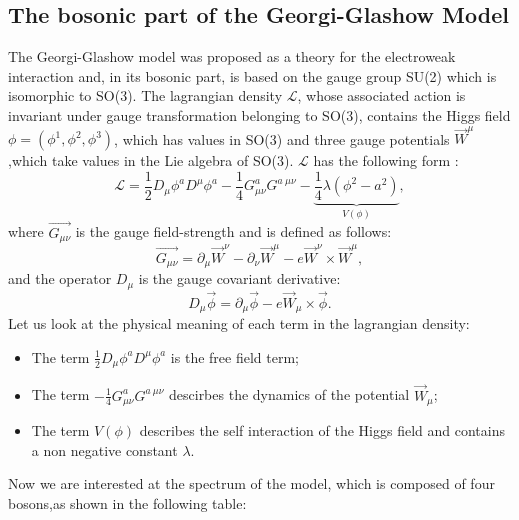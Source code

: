 \documentclass[main.tex]{subfiles}
\begin{document}
\subsection{The bosonic part of the Georgi-Glashow Model}
The Georgi-Glashow model was proposed as a theory for the electroweak interaction and, in its bosonic part, is based on the gauge group SU(2) which is isomorphic to SO(3).
The lagrangian density $\mathcal{L}$, whose associated action is invariant under gauge transformation belonging to SO(3), contains the Higgs field $\phi = ( \phi^1, \phi^2 , \phi^3)$, which has values in SO(3) and three gauge potentials $\Vec{W}^\mu$,which take values in the Lie algebra of SO(3).
$\mathcal{L}$ has the following form :
\begin{equation}
\mathcal{L}= \frac{1}{2}D_{\mu}\phi^a D^\mu \phi^a  -\frac{1}{4} G_{\mu \nu}^a G^{a \ \mu \nu} - \underbrace{\frac{1}{4}\lambda (\phi^2 -a^2)}_{V(\phi)},
\end{equation}
where $\Vec{G_{\mu \nu}}$ is the gauge field-strength and is defined as follows:
\begin{equation}
\Vec{G_{\mu \nu}} = \partial_{\mu}  \Vec{W}^\nu -\partial_{\nu}  \Vec{W}^\mu - e \Vec{W}^\nu \times \Vec{W}^\mu,
\end{equation}
and the operator $D_{\mu}$ is the gauge covariant derivative:
\begin{equation}
D_\mu \Vec{\phi} = \partial_\mu \Vec{\phi} - e \Vec{W}_\mu \times \Vec{\phi}.
\end{equation}
Let us look at the physical meaning of each term in the lagrangian density:
\begin{itemize}
    \item The term $\frac{1}{2}D_{\mu}\phi^a D^\mu \phi^a $ is the free field term;
    \item The term  $-\frac{1}{4} G_{\mu \nu}^a G^{a \ \mu \nu}$ descirbes the dynamics of the potential $\Vec{W}_{\mu}$;
    \item The term  $V(\phi) $ describes the self interaction of the Higgs field and contains a non negative constant $\lambda$.
\end{itemize}

Now we are interested at the spectrum of the model, which is composed of four bosons,as shown in the following table:
\end{document}

